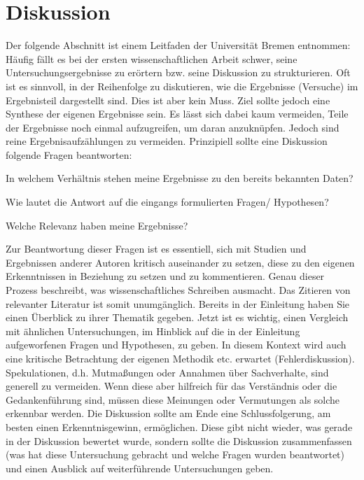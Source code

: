 
\chapter{Diskussion}
\label{chapter:diskussion}

Der folgende Abschnitt ist einem Leitfaden der Universität Bremen \cite{uni-bremen} entnommen:
Häufig fällt es bei der ersten wissenschaftlichen Arbeit schwer, seine Untersuchungsergebnisse zu erörtern bzw. seine Diskussion zu strukturieren. Oft ist es sinnvoll, in der Reihenfolge zu diskutieren, wie die Ergebnisse (Versuche) im Ergebnisteil dargestellt sind. Dies ist aber kein Muss. Ziel sollte jedoch eine Synthese der eigenen Ergebnisse sein. Es lässt sich dabei kaum vermeiden, Teile der Ergebnisse noch einmal aufzugreifen, um daran anzuknüpfen. Jedoch sind reine Ergebnisaufzählungen zu vermeiden. Prinzipiell sollte eine Diskussion folgende Fragen beantworten:

\begin{compactitem}
  \item In welchem Verhältnis stehen meine Ergebnisse zu den bereits bekannten Daten?
  \item Wie lautet die Antwort auf die eingangs formulierten Fragen/ Hypothesen?
  \item Welche Relevanz haben meine Ergebnisse?
\end{compactitem}

Zur Beantwortung dieser Fragen ist es essentiell, sich mit Studien und Ergebnissen anderer Autoren kritisch auseinander zu setzen, diese zu den eigenen Erkenntnissen in Beziehung zu setzen und zu kommentieren. Genau dieser Prozess beschreibt, was wissenschaftliches Schreiben ausmacht. Das Zitieren von relevanter Literatur ist somit unumgänglich. Bereits in der Einleitung haben Sie einen Überblick zu ihrer Thematik gegeben. Jetzt ist es wichtig, einen Vergleich mit ähnlichen Untersuchungen, im Hinblick auf die in der Einleitung aufgeworfenen Fragen und Hypothesen, zu geben. In diesem Kontext wird auch eine kritische Betrachtung der eigenen Methodik etc. erwartet (Fehlerdiskussion). Spekulationen, d.h. Mutmaßungen oder Annahmen über Sachverhalte, sind generell zu vermeiden. Wenn diese aber hilfreich für das Verständnis oder die Gedankenführung sind, müssen diese Meinungen oder Vermutungen als solche erkennbar werden.
Die Diskussion sollte am Ende eine Schlussfolgerung, am besten einen Erkenntnisgewinn, ermöglichen. Diese gibt nicht wieder, was gerade in der Diskussion bewertet wurde, sondern sollte die Diskussion zusammenfassen (was hat diese Untersuchung gebracht und welche Fragen wurden beantwortet) und einen Ausblick auf weiterführende Untersuchungen geben.

